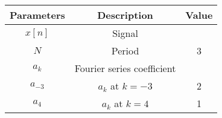 \begin{tabular}{|c|c|c|}
\hline
\textbf{Parameters} & \textbf{Description} & \textbf{Value} \\
\hline
$x[n]$ & Signal & \\
\hline
$N$ & Period & 3 \\
\hline
$a_k$ & Fourier series coefficient &\\
\hline
$a_{-3}$ & $a_k$ at $k=-3$ & 2 \\
\hline
$a_4$ & $a_k$ at $k=4$ & 1 \\
\hline
\end{tabular}
